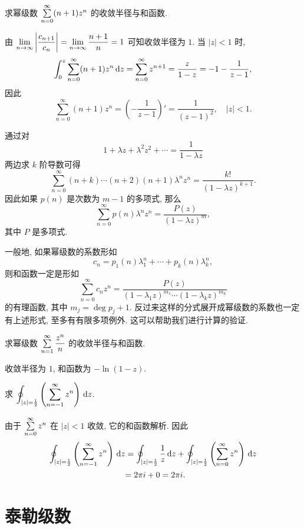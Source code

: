 \begin{example}
	求幂级数 $\sum\limits_{n=0}^\infty(n+1)z^n$ 的收敛半径与和函数.
\end{example}

\begin{solution}
	由 $\displaystyle\lim_{n\to\infty}\left|\frac{c_{n+1}}{c_n}\right|=\lim_{n\to\infty}\frac{n+1}n=1$ 可知收敛半径为 $1$.
{当 $|z|<1$ 时,
	\[\int_0^z\sum_{n=0}^\infty(n+1)z^n\,\mathrm{d} z=\sum_{n=0}^\infty z^{n+1}=\frac z{1-z}=-1-\frac1{z-1},\]
}{因此
	\[\sum_{n=0}^\infty(n+1)z^n=\left(-\frac1{z-1}\right)'=\frac1{(z-1)^2},\quad |z|<1.\]}
\end{solution}

通过对
\[1+\lambda z+\lambda^2 z^2+\cdots=\dfrac1{1-\lambda z}\]
两边求 $k$ 阶导数可得
\[\sum_{n=0}^{\infty}(n+k)\cdots(n+2)(n+1)\lambda^n z^n=\frac{k!}{(1-\lambda z)^{k+1}}.\]
因此如果 $p(n)$ 是次数为 $m-1$ 的多项式, 那么
\[\sum_{n=0}^\infty p(n)\lambda^n z^n=\frac{P(z)}{(1-\lambda z)^{m}},\]
其中 $P$ 是多项式.

一般地, 如果幂级数的系数形如
\[c_n=p_1(n)\lambda_1^n+\cdots+p_k(n)\lambda_k^n,\]
则和函数一定是形如
\[\sum_{n=0}^{\infty}c_nz^n
=\frac{P(z)}{(1-\lambda_1z)^{m_1}\cdots(1-\lambda_kz)^{m_k}}\]
的有理函数,	其中 $m_j=\deg p_j+1$.
反过来这样的分式展开成幂级数的系数也一定有上述形式, 至多有有限多项例外.
这可以帮助我们进行计算的验证.
\begin{exercise}
	求幂级数 $\sum\limits_{n=1}^\infty\dfrac{z^n}n$ 的收敛半径与和函数.
\end{exercise}

\begin{answer}
	收敛半径为 $1$, 和函数为 $-\ln(1-z)$.
\end{answer}

\begin{example}
	求 $\displaystyle\oint_{|z|=\frac{1}{2} }\left(\sum_{n=-1}^\infty z^n\right)\,\mathrm{d} z$.
\end{example}

\begin{solution}
	由于 $\sum\limits_{n=0}^\infty z^n$ 在 $|z|<1$ 收敛,
{它的和函数解析.
}{因此
	\begin{align*}
	\oint_{|z|=\frac{1}{2} }\left(\sum_{n=-1}^\infty z^n\right)\,\mathrm{d} z
	&=\oint_{|z|=\frac{1}{2} }\frac1z\,\mathrm{d} z+\oint_{|z|=\frac{1}{2} }\left(\sum_{n=0}^\infty z^n\right)\,\mathrm{d} z\\
	&{=2\pi i+0=2\pi i.}
\end{align*}}
\end{solution}

\section{泰勒级数}

